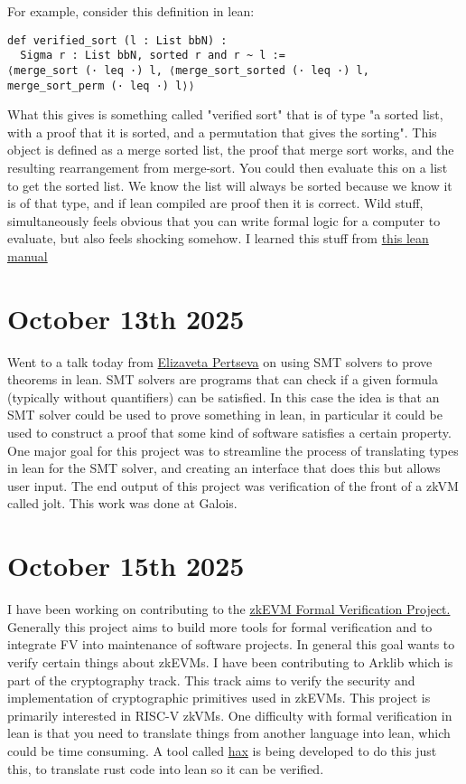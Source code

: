 \documentclass{amsart}
\theoremstyle{definition}
\begin{document}
For example, consider this definition in lean:


\begin{verbatim}
def verified_sort (l : List bbN) :
  Sigma r : List bbN, sorted r and r ~ l :=
⟨merge_sort (· leq ·) l, ⟨merge_sort_sorted (· leq ·) l, merge_sort_perm (· leq ·) l⟩⟩
\end{verbatim}


What this gives is something called "verified sort" that is of type "a sorted list, with a proof that it is sorted, and a permutation that gives the sorting". This object is defined as a merge sorted list, the proof that merge sort works, and the resulting rearrangement from merge-sort. You could then evaluate this on a list to get the sorted list. We know the list will always be sorted because we know it is of that type, and if lean compiled are proof then it is correct. Wild stuff, simultaneously feels obvious that you can write formal logic for a computer to evaluate, but also feels shocking somehow. I learned this stuff from \href{https://lean-lang.org/theorem_proving_in_lean4/Propositions-and-Proofs/#propositions-and-proofs}{this lean manual}

\section{October 13th 2025}

Went to a talk today from \href{https://www.galois.com/articles/automated-lean-proofs-for-every-type}{Elizaveta Pertseva} on using SMT solvers to prove theorems in lean. SMT solvers are programs that can check if a given formula (typically without quantifiers) can be satisfied. In this case the idea is that an SMT solver could be used to prove something in lean, in particular it could be used to construct a proof that some kind of software satisfies a certain property. One major goal for this project was to streamline the process of translating types in lean for the SMT solver, and creating an interface that does this but allows user input. The end output of this project was verification of the front of a zkVM called jolt. This work was done at Galois.

\section{October 15th 2025}
I have been working on contributing to the \href{https://verified-zkevm.org/}{zkEVM Formal Verification Project.} Generally this project aims to build more tools for formal verification and to integrate FV into maintenance of software projects. In general this goal wants to verify certain things about zkEVMs. I have been contributing to Arklib which is part of the cryptography track. This track aims to verify the security and implementation of cryptographic primitives used in zkEVMs. This project is primarily interested in RISC-V zkVMs. One difficulty with formal verification in lean is that you need to translate things from another language into lean, which could be time consuming. A tool called \href{https://github.com/cryspen/hax}{hax} is being developed to do this just this, to translate rust code into lean so it can be verified.
\end{document}
